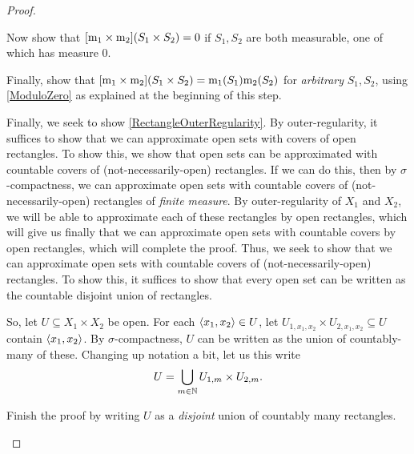 \begin{thm}
\begin{proof}
\begin{exr}
Now show that $[\mathrm{m} _1\times \mathrm{m} _2](S_1\times S_2)=0$ if $S_1,S_2$ are both measurable, one of which has measure $0$.
\end{exr}

\begin{exr}
Finally, show that $[\mathrm{m} _1\times \mathrm{m} _2](S_1\times S_2)=\mathrm{m} _1(S_1)\mathrm{m} _2(S_2)$ for \emph{arbitrary} $S_1,S_2$, using \cref{ModuloZero} as explained at the beginning of this step.
\end{exr}

Finally, we seek to show \eqref{RectangleOuterRegularity}.  By outer-regularity, it suffices to show that we can approximate open sets with covers of open rectangles.  To show this, we show that open sets can be approximated with countable covers of (not-necessarily-open) rectangles.  If we can do this, then by $\sigma$-compactness, we can approximate open sets with countable covers of (not-necessarily-open) rectangles of \emph{finite measure}.  By outer-regularity of $X_1$ and $X_2$, we will be able to approximate each of these rectangles by open rectangles, which will give us finally that we can approximate open sets with countable covers by open rectangles, which will complete the proof.  Thus, we seek to show that we can approximate open sets with countable covers of (not-necessarily-open) rectangles.  To show this, it suffices to show that every open set can be written as the countable disjoint union of rectangles.

So, let $U\subseteq X_1\times X_2$ be open.  For each $\langle x_1,x_2\rangle\in U$, let $U_{1,x_1,x_2}\times U_{2,x_1,x_2}\subseteq U$ contain $\langle x_1,x_2\rangle$.  By $\sigma$-compactness, $U$ can be written as the union of countably-many of these.  Changing up notation a bit, let us this write
\begin{equation}
U=\bigcup _{m\in \mathbb{N}}U_{1,m}\times U_{2,m}.
\end{equation}
\begin{exr}
Finish the proof by writing $U$ as a \emph{disjoint} union of countably many rectangles.
\end{exr}
\end{proof}
\end{thm}

